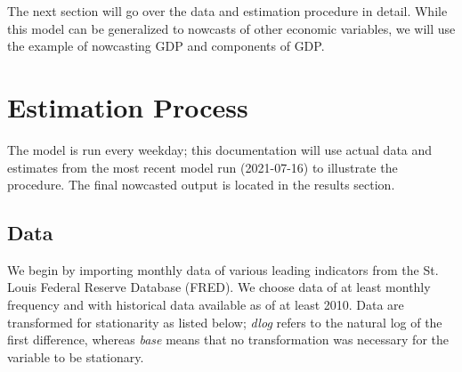 \documentclass[11pt, letterpaper]{article}\usepackage[]{graphicx}\usepackage[]{color}
\begin{document}
The next section will go over the data and estimation procedure in detail. While this model can be generalized to nowcasts of other economic variables, we will use the example of nowcasting GDP and components of GDP.

\newpage
\section{Estimation Process}
The model is run every weekday; this documentation will use actual data and estimates from the most recent model run (2021-07-16) to illustrate the procedure. The final nowcasted output is located in the results section.

\subsection{Data}
We begin by importing monthly data of various leading indicators from the St. Louis Federal Reserve Database (FRED). We choose data of at least monthly frequency and with historical data available as of at least 2010. Data are transformed for stationarity as listed below; \textit{dlog} refers to the natural log of the first difference, whereas \textit{base} means that no transformation was necessary for the variable to be stationary.
\end{document}
